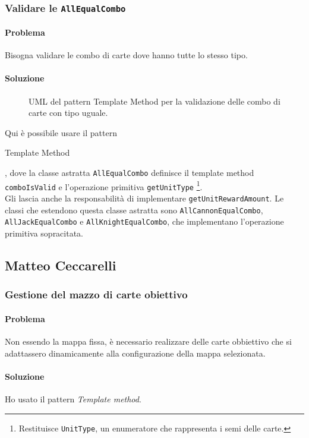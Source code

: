 \documentclass[a4paper,12pt]{report}
\begin{document}
\subsubsection{Validare le \texttt{AllEqualCombo}}
\paragraph{Problema}
Bisogna validare le combo di carte dove hanno tutte lo stesso tipo.
\paragraph{Soluzione}
\begin{figure}[H]
	\centering
	
	\caption{UML del pattern Template Method per la validazione delle combo di carte con tipo uguale.}
\end{figure}
Qui è possibile usare il pattern \begin{itshape}Template Method\end{itshape}, dove la classe astratta \texttt{AllEqualCombo} definisce il template method \texttt{comboIsValid} e l'operazione primitiva \texttt{getUnitType} \footnote{Restituisce \texttt{UnitType}, un enumeratore che rappresenta i semi delle carte.}.
\\
Gli lascia anche la responsabilità di implementare \texttt{getUnitRewardAmount}. Le classi che estendono questa classe astratta sono \texttt{AllCannonEqualCombo}, \texttt{AllJackEqualCombo} e \texttt{AllKnightEqualCombo}, che implementano l'operazione primitiva sopracitata.

\subsection{Matteo Ceccarelli}
\subsubsection{Gestione del mazzo di carte obiettivo}
\paragraph{Problema}
Non essendo la mappa fissa, è necessario realizzare delle carte obbiettivo che si adattassero dinamicamente alla configurazione della mappa selezionata.
\paragraph{Soluzione}
Ho usato il pattern \textit{Template method}.
\end{document}
